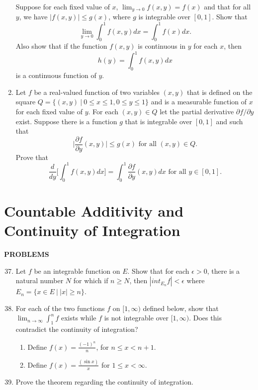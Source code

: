 \begin{enumerate}
    Suppose for each fixed value of $x$, $\lim_{y\to0}f(x,y)=f(x)$ and that for all $y$, we have $|f(x,y)|\le g(x)$, where $g$ is integrable over $[0,1]$. Show that
    \[
    \lim_{y\to0}\int_0^1f(x,y)dx=\int_0^1f(x)dx.    
    \] 
    Also show that if the function $f(x,y)$ is continuous in $y$ for each $x$, then 
    \[
        h(y)=\int_0^1f(x,y)dx  
    \]
    is a continuous function of $y$.
    \item Let $f$ be a real-valued function of two variables $(x,y)$ that is defined on the square $Q=\{(x,y)\ |\ 0\le x\le 1,0\le y\le 1\}$ and is a measurable function of $x$ for each fixed value of $y$.
    For each $(x,y)\in Q$ let the partial derivative $\partial f/\partial y$ exist. Suppose there is a function $g$ that is integrable over $[0,1]$ and such that 
    \[
        \biggl | \frac{\partial f}{\partial y}(x,y) \biggr | \le g(x)\text{ for all }(x,y)\in Q.
    \]
    Prove that 
    \[
        \frac{d}{dy}\biggl[\int_0^1f(x,y)dx\biggr]=\int_0^1\frac{\partial f}{\partial y}(x,y)dx\text{ for all }y\in [0,1].
    \]
\end{enumerate}

\section{Countable Additivity and Continuity of Integration}
\begin{center}
	\textbf{PROBLEMS}
\end{center}
\begin{enumerate}
	\setcounter{enumi}{36}
    \item Let $f$ be an integrable function on $E$. Show that for each $\epsilon>0$, there is a natural number $N$ for which if $n\ge N$, then $|int_{E_n}f|<\epsilon$ where $E_n=\{x\in E\ |\ |x|\ge n\}$.
    \item For each of the two functions $f$ on $[1,\infty)$ defined below, show that $\lim_{n\to\infty}\int_1^nf$ exists while $f$ is not integrable over $[1,\infty)$. Does this contradict the continuity of integration?
    \begin{enumerate}[label=(\roman*),align=left]
        \item Define $f(x)=\frac{(-1)^n}{n}$, for $n\le x < n+1$.
        \item Define $f(x) = \frac{(\sin x)}{x}$ for $1\le x<\infty$.
    \end{enumerate}
    \item Prove the theorem regarding the continuity of integration.
\end{enumerate}

